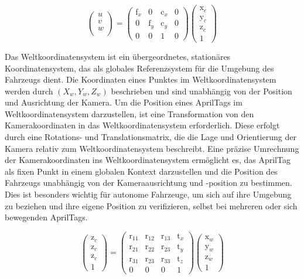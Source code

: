 \documentclass[ngerman]{article}    %
\theoremstyle{definition}
\begin{document}
\begin{equation}
    \begin{pmatrix}
        u \\
        v\\
        w\\
    \end{pmatrix} =
    \begin{pmatrix}
         \text{f}_x & 0 & \text{c}_x & 0 \\ 0 & \text{f}_y & \text{c}_y & 0 \\ 0 & 0 & 1 & 0
    \end{pmatrix}
    \begin{pmatrix}
        \text{x}_c \\
        \text{y}_c \\
        \text{z}_c \\
        1
    \end{pmatrix}
\end{equation}


Das Weltkoordinatensystem ist ein übergeordnetes, stationäres Koordinatensystem, das als globales Referenzsystem für die Umgebung des Fahrzeugs dient. Die Koordinaten eines Punktes im Weltkoordinatensystem werden durch \( (X_w, Y_w, Z_w) \) beschrieben und sind unabhängig von der Position und Ausrichtung der Kamera. Um die Position eines AprilTags im Weltkoordinatensystem darzustellen, ist eine Transformation von den Kamerakoordinaten in das Weltkoordinatensystem erforderlich. Diese erfolgt durch eine Rotations- und Translationsmatrix, die die Lage und Orientierung der Kamera relativ zum Weltkoordinatensystem beschreibt. Eine präzise Umrechnung der Kamerakoordinaten ins Weltkoordinatensystem ermöglicht es, das AprilTag als fixen Punkt in einem globalen Kontext darzustellen und die Position des Fahrzeugs unabhängig von der Kameraausrichtung und -position zu bestimmen. Dies ist besonders wichtig für autonome Fahrzeuge, um sich auf ihre Umgebung zu beziehen und ihre eigene Position zu verifizieren, selbst bei mehreren oder sich bewegenden AprilTags.

\begin{equation}
    \begin{pmatrix}
        \text{z}_c \\
        \text{z}_c \\
        \text{z}_c \\
        1
    \end{pmatrix} = \begin{pmatrix}
        \text{r}_{11} & \text{r}_{12} & \text{r}_{13} & \text{t}_x \\
        \text{r}_{21} & \text{r}_{22} & \text{r}_{23} & \text{t}_y \\
        \text{r}_{31} & \text{r}_{23} & \text{r}_{33} & \text{t}_z \\
        0 & 0 & 0 & 1
    \end{pmatrix}
    \begin{pmatrix}
        \text{x}_w \\
        \text{y}_w \\
        \text{z}_w \\
        1
    \end{pmatrix}
\end{equation}
\end{document}
